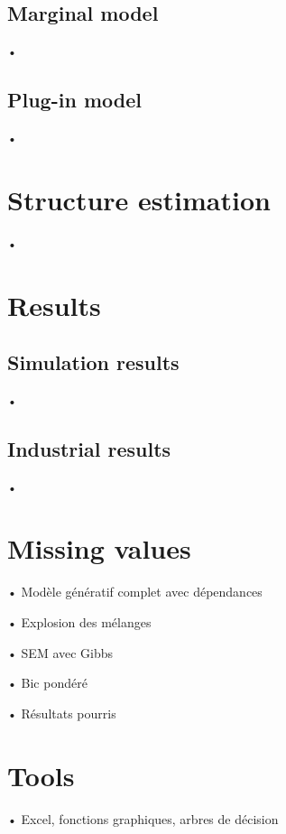 \documentclass[11pt]{beamer}
\begin{document}
	\subsection{Marginal model}
		\begin{frame}{•}
		
		\end{frame}
	\subsection{Plug-in model}
		\begin{frame}{•}
		
		\end{frame}
\section{Structure estimation}
	\begin{frame}{•}
	
	\end{frame}

\section{Results}
	\subsection{Simulation results}
		\begin{frame}{•}
		
		\end{frame}
	\subsection{Industrial results}
		\begin{frame}{•}
		
		\end{frame}
\section{Missing values}
	\begin{frame}{•}
	Modèle génératif complet avec dépendances
	\end{frame}
	\begin{frame}{•}
	Explosion des mélanges 
	\end{frame}
	\begin{frame}{•}
	SEM avec Gibbs 
	\end{frame}
	\begin{frame}{•}
	Bic pondéré 
	\end{frame}
	\begin{frame}{•}
	Résultats pourris 
	\end{frame}
\section{Tools}
	\begin{frame}{•}
		Excel, fonctions graphiques, arbres de décision
	\end{frame}

\begin{frame}

%

\end{frame}
\end{document}
